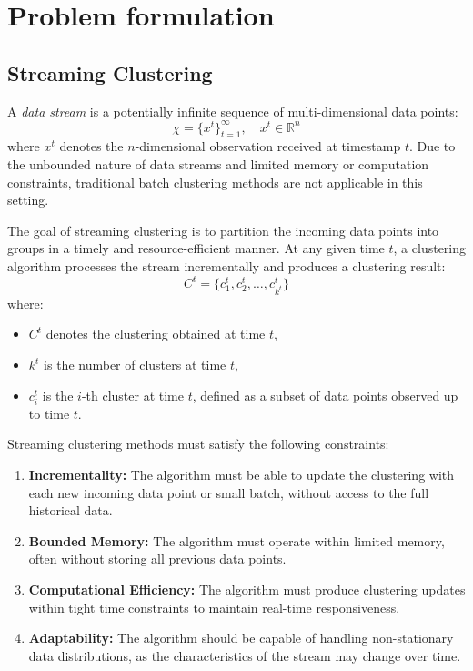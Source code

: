 \chapter{Problem formulation}\label{ch:problem_formulation}

\section{Streaming Clustering}\label{sec:prob_streaming_clustering}
A \textit{data stream} is a potentially infinite sequence of multi-dimensional
data points:
\begin{equation}
    \chi = \{x^t\}_{t=1}^{\infty}, \quad x^t \in \mathbb{R}^n
\end{equation}
where $x^t$ denotes the $n$-dimensional observation received at timestamp $t$.
Due to the unbounded nature of data streams and limited memory or computation
constraints, traditional batch clustering methods are not applicable in this
setting.

The goal of streaming clustering is to partition the incoming data points into
groups in a timely and resource-efficient manner. At any given time $t$, a
clustering algorithm processes the stream incrementally and produces a
clustering result:
\begin{equation}
    C^t = \{c_1^t, c_2^t, \dots, c_{k^t}^t\}
\end{equation}
where:
\begin{itemize}
    \item $C^t$ denotes the clustering obtained at time $t$,
    \item $k^t$ is the number of clusters at time $t$,
    \item $c_i^t$ is the $i$-th cluster at time $t$, defined as a subset of data
          points observed up to time $t$.
\end{itemize}

Streaming clustering methods must satisfy the following constraints:

\begin{enumerate}
    \item \textbf{Incrementality:} The algorithm must be able to update the clustering
          with each new incoming data point or small batch, without access to the full
          historical data.

    \item \textbf{Bounded Memory:} The algorithm must operate within limited memory,
          often without storing all previous data points.

    \item \textbf{Computational Efficiency:} The algorithm must produce clustering
          updates within tight time constraints to maintain real-time responsiveness.

    \item \textbf{Adaptability:} The algorithm should be capable of handling non-stationary
          data distributions, as the characteristics of the stream may change over time.
\end{enumerate}


